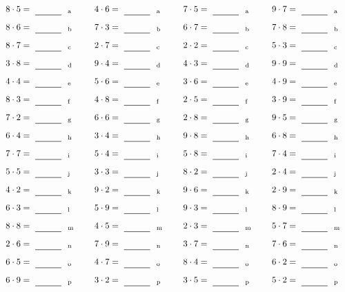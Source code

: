 \documentclass
[
  draft    = true,
  fontsize = 11pt,
  parskip  = half-
]
{scrartcl}
\begin{document}
\par\vfill\par
\begin{align*}
    \pline{8\cdot5}&=\rline{a}
  & \pline{4\cdot6}&=\rline{a}
  & \pline{7\cdot5}&=\rline{a}
  & \pline{9\cdot7}&=\rline{a} \\[1ex]
    \pline{8\cdot6}&=\rline{b}
  & \pline{7\cdot3}&=\rline{b}
  & \pline{6\cdot7}&=\rline{b}
  & \pline{7\cdot8}&=\rline{b} \\[1ex]
    \pline{8\cdot7}&=\rline{c}
  & \pline{2\cdot7}&=\rline{c}
  & \pline{2\cdot2}&=\rline{c}
  & \pline{5\cdot3}&=\rline{c} \\[1ex]
    \pline{3\cdot8}&=\rline{d}
  & \pline{9\cdot4}&=\rline{d}
  & \pline{4\cdot3}&=\rline{d}
  & \pline{9\cdot9}&=\rline{d} \\[1ex]
    \pline{4\cdot4}&=\rline{e}
  & \pline{5\cdot6}&=\rline{e}
  & \pline{3\cdot6}&=\rline{e}
  & \pline{4\cdot9}&=\rline{e} \\[1ex]
    \pline{8\cdot3}&=\rline{f}
  & \pline{4\cdot8}&=\rline{f}
  & \pline{2\cdot5}&=\rline{f}
  & \pline{3\cdot9}&=\rline{f} \\[1ex]
    \pline{7\cdot2}&=\rline{g}
  & \pline{6\cdot6}&=\rline{g}
  & \pline{2\cdot8}&=\rline{g}
  & \pline{9\cdot5}&=\rline{g} \\[1ex]
    \pline{6\cdot4}&=\rline{h}
  & \pline{3\cdot4}&=\rline{h}
  & \pline{9\cdot8}&=\rline{h}
  & \pline{6\cdot8}&=\rline{h} \\[1ex]
    \pline{7\cdot7}&=\rline{i}
  & \pline{5\cdot4}&=\rline{i}
  & \pline{5\cdot8}&=\rline{i}
  & \pline{7\cdot4}&=\rline{i} \\[1ex]
    \pline{5\cdot5}&=\rline{j}
  & \pline{3\cdot3}&=\rline{j}
  & \pline{8\cdot2}&=\rline{j}
  & \pline{2\cdot4}&=\rline{j} \\[1ex]
    \pline{4\cdot2}&=\rline{k}
  & \pline{9\cdot2}&=\rline{k}
  & \pline{9\cdot6}&=\rline{k}
  & \pline{2\cdot9}&=\rline{k} \\[1ex]
    \pline{6\cdot3}&=\rline{l}
  & \pline{5\cdot9}&=\rline{l}
  & \pline{9\cdot3}&=\rline{l}
  & \pline{8\cdot9}&=\rline{l} \\[1ex]
    \pline{8\cdot8}&=\rline{m}
  & \pline{4\cdot5}&=\rline{m}
  & \pline{2\cdot3}&=\rline{m}
  & \pline{5\cdot7}&=\rline{m} \\[1ex]
    \pline{2\cdot6}&=\rline{n}
  & \pline{7\cdot9}&=\rline{n}
  & \pline{3\cdot7}&=\rline{n}
  & \pline{7\cdot6}&=\rline{n} \\[1ex]
    \pline{6\cdot5}&=\rline{o}
  & \pline{4\cdot7}&=\rline{o}
  & \pline{8\cdot4}&=\rline{o}
  & \pline{6\cdot2}&=\rline{o} \\[1ex]
    \pline{6\cdot9}&=\rline{p}
  & \pline{3\cdot2}&=\rline{p}
  & \pline{3\cdot5}&=\rline{p}
  & \pline{5\cdot2}&=\rline{p}
\end{align*}
\end{document}
